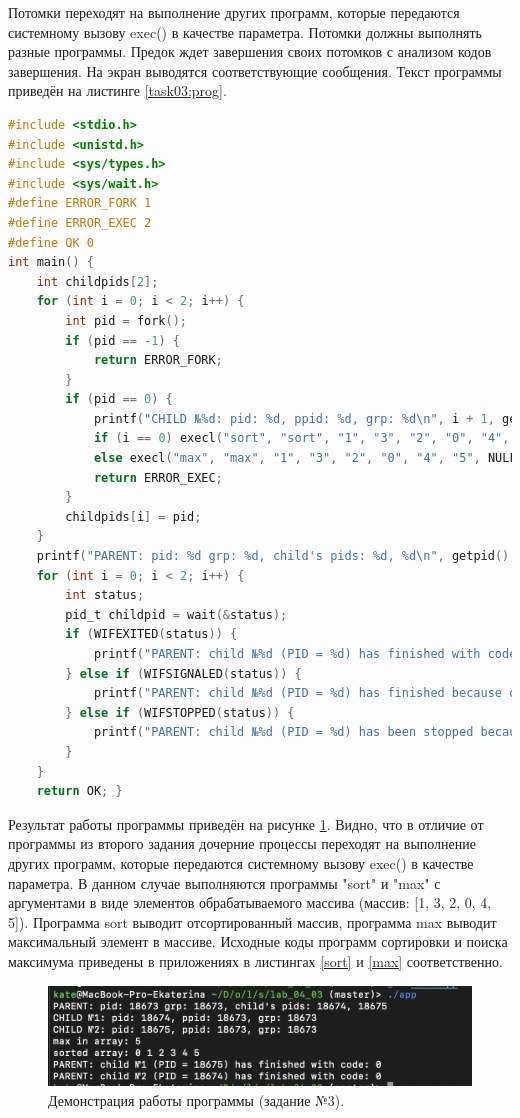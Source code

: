 \documentclass[12pt]{report}
\begin{document}
Потомки переходят на выполнение других программ, которые передаются системному вызову exec() в качестве параметра. Потомки должны выполнять разные программы. Предок ждет завершения своих потомков с анализом кодов завершения. На экран выводятся соответствующие сообщения. Текст программы приведён на листинге \ref{task03:prog}.

\begin{lstlisting}[label=task03:prog,caption=Системный вызов exec(),language=C]
#include <stdio.h>
#include <unistd.h>
#include <sys/types.h>
#include <sys/wait.h>
#define ERROR_FORK 1
#define ERROR_EXEC 2
#define OK 0
int main() {
    int childpids[2];
    for (int i = 0; i < 2; i++) {
        int pid = fork();
        if (pid == -1) {
            return ERROR_FORK;
        }
        if (pid == 0) {
            printf("CHILD №%d: pid: %d, ppid: %d, grp: %d\n", i + 1, getpid(), getppid(), getpgrp());
            if (i == 0) execl("sort", "sort", "1", "3", "2", "0", "4", "5", NULL);
            else execl("max", "max", "1", "3", "2", "0", "4", "5", NULL);
            return ERROR_EXEC;
        }
        childpids[i] = pid;
    }
    printf("PARENT: pid: %d grp: %d, child's pids: %d, %d\n", getpid(), getpgrp(), childpids[0], childpids[1]);
    for (int i = 0; i < 2; i++) {
        int status;
        pid_t childpid = wait(&status);
        if (WIFEXITED(status)) {
            printf("PARENT: child №%d (PID = %d) has finished with code: %d\n", i + 1, childpid, WEXITSTATUS(status));
        } else if (WIFSIGNALED(status)) {
            printf("PARENT: child №%d (PID = %d) has finished because of signal: %d\n", i + 1, childpid, WTERMSIG(status));
        } else if (WIFSTOPPED(status)) {
            printf("PARENT: child №%d (PID = %d) has been stopped because of signal: %d\n", i + 1, childpid, WSTOPSIG(status));
        }
    }
    return OK; }
\end{lstlisting}

Результат работы программы приведён на рисунке \ref{task03:demo}. Видно, что в отличие от программы из второго задания дочерние процессы переходят на выполнение других программ, которые передаются системному вызову exec() в качестве параметра. В данном случае выполняются программы "sort" и "max" с аргументами в виде элементов обрабатываемого массива (массив: [1, 3, 2, 0, 4, 5]). Программа sort выводит отсортированный массив, программа max выводит максимальный элемент в массиве. Исходные коды программ сортировки и поиска максимума приведены в приложениях в листингах \ref{sort} и \ref{max} соответственно.
\begin{figure}[H]
	\centering
	\includegraphics[width=\linewidth]{task03.png}
	\caption{Демонстрация работы программы (задание №3).}
	\label{task03:demo}

\end{figure}
\newpage
\end{document}
